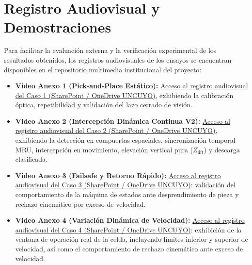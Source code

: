 \documentclass[12pt, a4paper]{report}
\begin{document}
\section{Registro Audiovisual y Demostraciones}
Para facilitar la evaluación externa y la verificación experimental de los resultados obtenidos, los registros audiovisuales de los ensayos se encuentran disponibles en el repositorio multimedia institucional del proyecto:
\begin{itemize}
    \item \textbf{Video Anexo 1 (Pick-and-Place Estático):} \href{https://universidadcuyo-my.sharepoint.com/:v:/g/personal/molina_matias_uncuyo_edu_ar/IQAEfuTCPxe3T4dsjXcwBnaGAX35Iyutr4qPirEA1u29M0E?e=xh17bC&nav=eyJyZWZlcnJhbEluZm8iOnsicmVmZXJyYWxBcHAiOiJTdHJlYW1XZWJBcHAiLCJyZWZlcnJhbE1vZGUiOiJtaXMiLCJyZWZlcnJhbFZpZXciOiJwb3N0cm9sbC1jb3B5bGluayIsInJlZmVycmFsUGxheWJhY2tTZXNzaW9uSWQiOiIwYjc5ZTc4OC1jYmUwLTQ1OWYtOTJlZi04ZTNkYzM1Yjc1MjcifX0%3D}{Acceso al registro audiovisual del Caso 1 (SharePoint / OneDrive UNCUYO)}, exhibiendo la calibración óptica, repetibilidad y validación del lazo cerrado de visión.
    \item \textbf{Video Anexo 2 (Intercepción Dinámica Continua V2):} \href{https://universidadcuyo-my.sharepoint.com/personal/molina_matias_uncuyo_edu_ar/_layouts/15/stream.aspx?id=%2Fpersonal%2Fmolina%5Fmatias%5Funcuyo%5Fedu%5Far%2FDocuments%2FPFE%2FCaso%202%20Dinamico%20Continuo%2FCasoDinamico2%2Emkv&referrer=StreamWebApp%2EWeb&referrerScenario=AddressBarCopied%2Eview%2Ec2cd7f54%2D5756%2D4111%2Dabd3%2D65ea02b11d6f}{Acceso al registro audiovisual del Caso 2 (SharePoint / OneDrive UNCUYO)}, exhibiendo la detección en compuertas espaciales, sincronización temporal MRU, intercepción en movimiento, elevación vertical pura ($Z_{\text{lift}}$) y descarga clasificada.
    \item \textbf{Video Anexo 3 (Failsafe y Retorno Rápido):} \href{https://universidadcuyo-my.sharepoint.com/:v:/g/personal/molina_matias_uncuyo_edu_ar/IQC4HhHrg-AMSam3l6sVpuQnAaCE1OA0pd9p2rAQQmxLEsE?e=YsTjAv&nav=eyJyZWZlcnJhbEluZm8iOnsicmVmZXJyYWxBcHAiOiJTdHJlYW1XZWJBcHAiLCJyZWZlcnJhbE1vZGUiOiJtaXMiLCJyZWZlcnJhbFZpZXciOiJwb3N0cm9sbC1jb3B5bGluayIsInJlZmVycmFsUGxheWJhY2tTZXNzaW9uSWQiOiIzNzNjZGEwNS04NGYwLTQ2MTYtYTJjNi1kNDBiYjBlMGJkYjkifX0%3D}{Acceso al registro audiovisual del Caso 3 (SharePoint / OneDrive UNCUYO)}: validación del comportamiento de la máquina de estados ante desprendimiento de pieza y rechazo cinemático por exceso de velocidad.
    \item \textbf{Video Anexo 4 (Variación Dinámica de Velocidad):} \href{https://universidadcuyo-my.sharepoint.com/personal/molina_matias_uncuyo_edu_ar/_layouts/15/stream.aspx?id=%2Fpersonal%2Fmolina%5Fmatias%5Funcuyo%5Fedu%5Far%2FDocuments%2FPFE%2FVariacion%20de%20Velocidad%2FVariacionVelocidad%2Emkv&referrer=StreamWebApp%2EWeb&referrerScenario=AddressBarCopied%2Eview%2Ed1eaa3d8%2D2e32%2D4f63%2D8ca6%2D296c463a265b}{Acceso al registro audiovisual del Caso 4 (SharePoint / OneDrive UNCUYO)}: exhibición de la ventana de operación real de la celda, incluyendo límites inferior y superior de velocidad, así como el comportamiento de rechazo cinemático ante exceso de velocidad.
\end{itemize}
\end{document}
